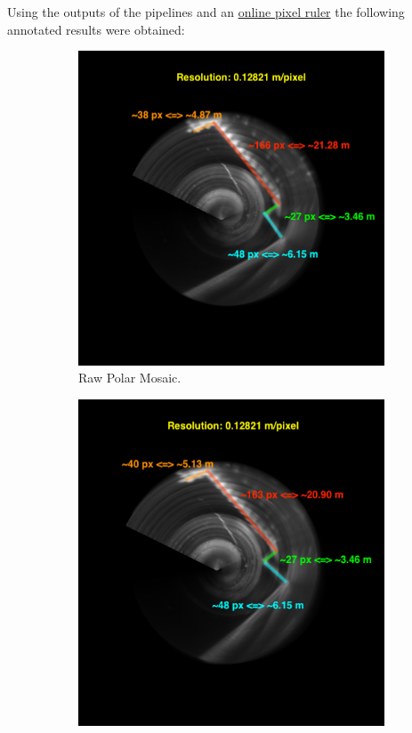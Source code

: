 Using the outputs of the pipelines and an \href{https://www.utilities-online.info/online-pixel-ruler}{online pixel ruler} the following annotated results were obtained:

\begin{figure}[H]
    \centering
    \begin{subfigure}[b]{0.47\textwidth}
        \centering
        \includegraphics[width=\textwidth]{figures/results/Real/PC-Rotation-Annotated.png}
        \caption{Raw Polar Mosaic.}
    \end{subfigure}
    \hfill
    \begin{subfigure}[b]{0.47\textwidth}
        \centering
        \includegraphics[width=\textwidth]{figures/results/Real/FMT-Rotation-Annotated.png}

\end{subfigure}
\end{figure}
